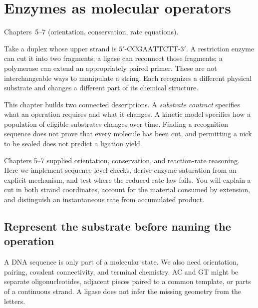\chapter{Enzymes as molecular operators}
\label{ch:enzymes}
{Chapters~5--7 (orientation, conservation, rate equations).}

Take a duplex whose upper strand is $5'\text{-CCGAATTCTT-}3'$. A restriction enzyme can cut it into two fragments; a ligase can reconnect those fragments; a polymerase can extend an appropriately paired primer. These are not interchangeable ways to manipulate a string. Each recognizes a different physical substrate and changes a different part of its chemical structure.

This chapter builds two connected descriptions. A \emph{substrate contract} specifies what an operation requires and what it changes. A kinetic model specifies how a population of eligible substrates changes over time. Finding a recognition sequence does not prove that every molecule has been cut, and permitting a nick to be sealed does not predict a ligation yield.

Chapters 5--7 supplied orientation, conservation, and reaction-rate reasoning. Here we implement sequence-level checks, derive enzyme saturation from an explicit mechanism, and test where the reduced rate law fails. You will explain a cut in both strand coordinates, account for the material consumed by extension, and distinguish an instantaneous rate from accumulated product.

\section{Represent the substrate before naming the operation}

A DNA sequence is only part of a molecular state. We also need orientation, pairing, covalent connectivity, and terminal chemistry. AC and GT might be separate oligonucleotides, adjacent pieces paired to a common template, or parts of a continuous strand. A ligase does not infer the missing geometry from the letters.

